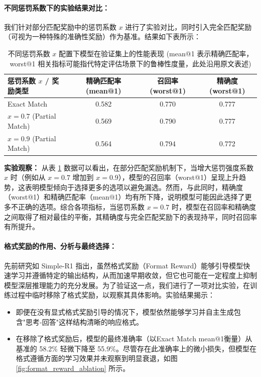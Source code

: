 \documentclass{article}
\begin{document}
\paragraph{不同惩罚系数下的实验结果对比：}
我们针对部分匹配奖励中的惩罚系数 $x$ 进行了实验对比，同时引入完全匹配奖励（可视为一种特殊的准确性奖励）作为基准。结果如下表所示：

\begin{table}[h]
\centering
\caption{不同惩罚系数 $x$ 配置下模型在验证集上的性能表现 (mean@1 表示精确匹配率，worst@1 相关指标可能指代特定评估场景下的鲁棒性度量，此处沿用原文表述)}
\begin{tabular}{l|c|c|c}
\hline
惩罚系数 $x$ / 奖励类型 & 精确匹配率 (mean@1) & 召回率 (worst@1) & 精确度 (worst@1) \\
\hline
Exact Match & 0.582 & 0.770 & 0.777 \\
$x=0.7$ (Partial Match) & 0.569 & 0.790 & 0.777 \\
$x=0.9$ (Partial Match) & 0.564 & 0.794 & 0.772 \\
\hline
\end{tabular}
\label{tab:penalty_coefficient_comparison}
\end{table}

\textbf{实验观察：} 从表 \ref{tab:penalty_coefficient_comparison} 数据可以看出，在部分匹配奖励机制下，当增大惩罚强度系数 $x$ 时（例如从 $x=0.7$ 增加到 $x=0.9$），模型的召回率（worst@1）呈现上升趋势，这表明模型倾向于选择更多的选项以避免漏选。然而，与此同时，精确度（worst@1）和精确匹配率（mean@1）均有所下降，说明模型可能因此选择了更多不正确的选项。综合各项指标，当惩罚系数 $x=0.7$ 时，模型在召回率和精确度之间取得了相对最佳的平衡，其精确度与完全匹配奖励下的表现持平，同时召回率有所提升。

\paragraph{格式奖励的作用、分析与最终选择：}
先前研究如 Simple-R1 \cite{zeng2025simplerl} 指出，虽然格式奖励（Format Reward）能够引导模型快速学习并遵循特定的输出结构，从而加速早期收敛，但它也可能在一定程度上抑制模型深层推理能力的充分发展。为了验证这一点，我们进行了一项对比实验，在训练过程中临时移除了格式奖励，以观察其具体影响。实验结果揭示：
\begin{itemize}
    \item 即便在没有显式格式奖励引导的情况下，模型依然能够学习并自主生成包含"思考-回答"这样结构清晰的响应格式。
    \item 在移除了格式奖励后，模型的最终准确率（以Exact Match mean@1衡量）从基准的 58.2\% 轻微下降至 55.9\%。尽管存在此准确率上的微小损失，但模型在格式遵循方面的学习效果并未观察到明显衰退，如图 \ref{fig:format_reward_ablation} 所示。
\end{itemize}
\end{document}

